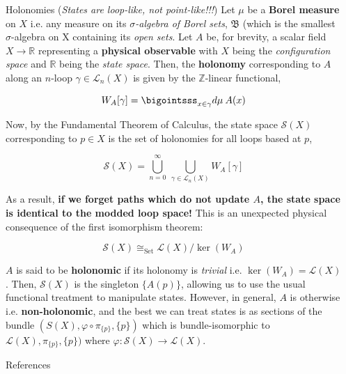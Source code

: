 \documentclass[final]{beamer}
\newenvironment{highlight}
{\begin{tcolorbox}[colback=lightblue, boxrule=0pt, frame empty]}
{\end{tcolorbox}}
\newlength{\sepwidth}
\newlength{\colwidth}
\newcommand{\separatorcolumn}{\begin{column}{\sepwidth}\end{column}}
\newcommand{\mb}{\mathbb}
\newcommand{\mc}{\mathcal}
\newcommand{\mf}{\mathfrak}
\theoremstyle{remark}
\begin{document}
\begin{frame}[t]
\begin{columns}[t]
\begin{column}{\colwidth}
\begin{block}{Holonomies (\emph{States are loop-like, \emph{not} point-like!!!})}
Let $\mu$ be a \textbf{Borel measure} on $X$ i.e. any measure on its \emph{$\sigma$-algebra of Borel sets}, $\mf{B}$ (which is the smallest $\sigma$-algebra on X containing its \emph{open sets}. Let $A$ be, for brevity, a scalar field $X \to \mb{R}$ representing a \textbf{physical observable} with $X$ being the \emph{configuration space} and $\mb{R}$ being the \emph{state space}. Then, the \textbf{holonomy} corresponding to $A$ along an $n$-loop $\gamma \in \mc{L}_n(X)$ is given by the $\mb{Z}$-linear functional,

$$W_A[\gamma] = \bigointsss_{x \in \gamma} d \mu \: A(x)$$

Now, by the Fundamental Theorem of Calculus, the state space $\mc{S}(X)$ corresponding to $p \in X$ is the set of holonomies for all loops based at $p$,

$$\mc{S}(X) = \bigcup_{n = 0}^{\infty} \: \bigcup_{\gamma \in \mc{L}_n(X)} W_A[\gamma]$$

As a result, \textbf{if we forget paths which do not update $A$, the state space is identical to the modded loop space!} This is an unexpected physical consequence of the first isomorphism theorem:

\begin{highlight}
$$\mc{S}(X) \cong_{\text{Set}} \mc{L}(X)/{\ker(W_A)}$$
\end{highlight}

$A$ is said to be \textbf{holonomic} if its holonomy is \emph{trivial} i.e. $\ker(W_A) = \mc{L}(X)$. Then, $\mc{S}(X)$ is the singleton $\{ A(p) \}$, allowing us to use the usual functional treatment to manipulate states. However, in general, $A$ is otherwise i.e. \textbf{non-holonomic}, and the best we can treat states is as sections of the bundle $(S(X), \varphi \circ \pi_{\{ p \}}, \{ p \})$ which is bundle-isomorphic to $\mc{L}(X), \pi_{\{ p \}}, \{ p \})$ where $\varphi : \mc{S}(X) \to \mc{L}(X)$.

\end{block}

\begin{block}{References}

\nocite{*}
\footnotesize{}

\end{block}

\end{column}

\separatorcolumn
\end{columns}
\end{frame}
\end{document}
